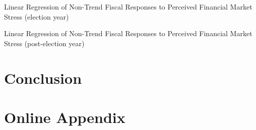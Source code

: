 \documentclass[]{article}
\begin{document}
\begin{table}
    \caption{Linear Regression of Non-Trend Fiscal Responses to Perceived Financial Market Stress (election year)}
    \label{t0_stress}

    \begin{center}
        
    \end{center}

\end{table}

\begin{table}
    \caption{Linear Regression of Non-Trend Fiscal Responses to Perceived Financial Market Stress (post-election year)}
    \label{t1_stress}

    \begin{center}
        
    \end{center}

\end{table}


\section*{Conclusion}







\section{Online Appendix}


\end{document}
